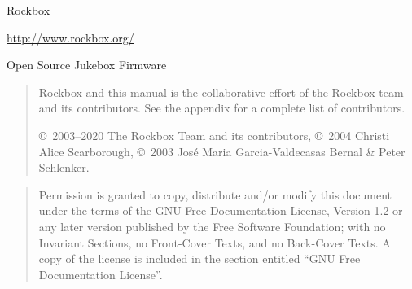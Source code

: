 %
%
%
%
%
\Ifpdfoutput{
\newcommand{\latexbuild}{pdf\LaTeX}}
{\newcommand{\latexbuild}{\TeX4ht}}

%
{\begin{center}{\Large{Rockbox}}\end{center}}

\vspace{1cm}
\noindent
\begin{center}
\url{http://www.rockbox.org/}

\noindent
Open Source Jukebox Firmware
\end{center}

\vspace{6cm}
\begin{quote}
Rockbox and this manual is the collaborative effort of the
Rockbox team and its contributors. See the appendix for a complete list of
contributors.

\copyright~2003--2020 The Rockbox Team and its contributors,
\copyright~2004 Christi Alice Scarborough,
\copyright~2003 Jos\'{e} Maria Garcia-Valdecasas Bernal \& Peter Schlenker.
\end{quote}
\vspace{3mm}
\begin{center}
\end{center}

\vspace{\fill}
\begin{quote}
  Permission is granted to copy, distribute and/or modify this document
  under the terms of the GNU Free Documentation License, Version 1.2
  or any later version published by the Free Software Foundation;
  with no Invariant Sections, no Front-Cover Texts, and no Back-Cover Texts.
  A copy of the license is included in the section entitled ``GNU
  Free Documentation License''.
\end{quote}


